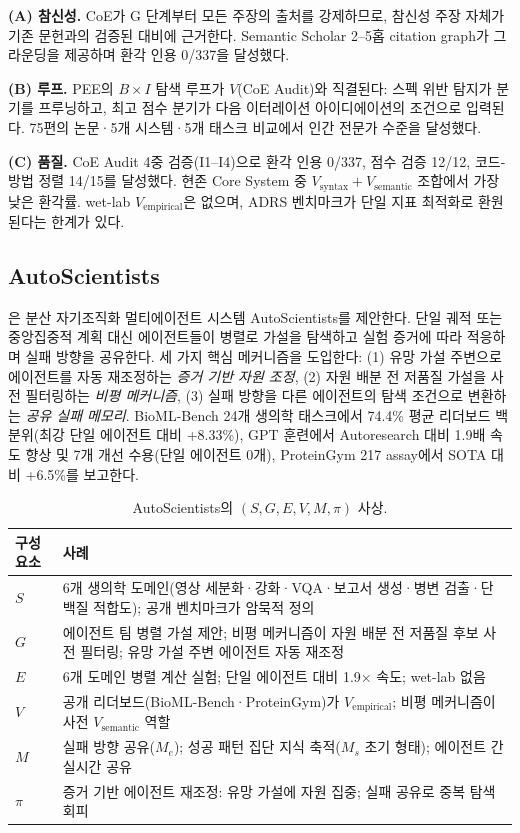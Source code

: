 \documentclass[11pt]{article}
\newcommand{\sgmvpi}{$(S, G, E, V, M, \pi)$}
\begin{document}
\noindent\textbf{(A) 참신성.} CoE가 G 단계부터 모든 주장의 출처를 강제하므로, 참신성 주장 자체가 기존 문헌과의 검증된 대비에 근거한다. Semantic Scholar 2--5홉 citation graph가 그라운딩을 제공하며 환각 인용 0/337을 달성했다.

\noindent\textbf{(B) 루프.} PEE의 $B \times I$ 탐색 루프가 $V$(CoE Audit)와 직결된다: 스펙 위반 탐지가 분기를 프루닝하고, 최고 점수 분기가 다음 이터레이션 아이디에이션의 조건으로 입력된다. 75편의 논문·5개 시스템·5개 태스크 비교에서 인간 전문가 수준을 달성했다.

\noindent\textbf{(C) 품질.} CoE Audit 4중 검증(I1--I4)으로 환각 인용 0/337, 점수 검증 12/12, 코드-방법 정렬 14/15를 달성했다. 현존 Core System 중 $V_\text{syntax}+V_\text{semantic}$ 조합에서 가장 낮은 환각률. wet-lab $V_\text{empirical}$은 없으며, ADRS 벤치마크가 단일 지표 최적화로 환원된다는 한계가 있다.

\subsection{AutoScientists}
\label{sec:autoscientists}

\citet{gao2026autoscientists}은 분산 자기조직화 멀티에이전트 시스템 AutoScientists를 제안한다. 단일 궤적 또는 중앙집중적 계획 대신 에이전트들이 병렬로 가설을 탐색하고 실험 증거에 따라 적응하며 실패 방향을 공유한다. 세 가지 핵심 메커니즘을 도입한다: (1) 유망 가설 주변으로 에이전트를 자동 재조정하는 \textit{증거 기반 자원 조정}, (2) 자원 배분 전 저품질 가설을 사전 필터링하는 \textit{비평 메커니즘}, (3) 실패 방향을 다른 에이전트의 탐색 조건으로 변환하는 \textit{공유 실패 메모리}. BioML-Bench 24개 생의학 태스크에서 74.4\% 평균 리더보드 백분위(최강 단일 에이전트 대비 +8.33\%), GPT 훈련에서 Autoresearch 대비 1.9배 속도 향상 및 7개 개선 수용(단일 에이전트 0개), ProteinGym 217 assay에서 SOTA 대비 +6.5\%를 보고한다.

\begin{table}[h]
\centering
\small
\begin{tabular}{@{}lp{9cm}@{}}
\toprule
구성요소 & 사례 \\
\midrule
$S$ & 6개 생의학 도메인(영상 세분화·강화·VQA·보고서 생성·병변 검출·단백질 적합도); 공개 벤치마크가 암묵적 정의 \\
$G$ & 에이전트 팀 병렬 가설 제안; 비평 메커니즘이 자원 배분 전 저품질 후보 사전 필터링; 유망 가설 주변 에이전트 자동 재조정 \\
$E$ & 6개 도메인 병렬 계산 실험; 단일 에이전트 대비 1.9$\times$ 속도; wet-lab 없음 \\
$V$ & 공개 리더보드(BioML-Bench·ProteinGym)가 $V_\text{empirical}$; 비평 메커니즘이 사전 $V_\text{semantic}$ 역할 \\
$M$ & 실패 방향 공유($M_e$); 성공 패턴 집단 지식 축적($M_s$ 초기 형태); 에이전트 간 실시간 공유 \\
$\pi$ & 증거 기반 에이전트 재조정: 유망 가설에 자원 집중; 실패 공유로 중복 탐색 회피 \\
\bottomrule
\end{tabular}
\caption{AutoScientists의 \sgmvpi{} 사상.}
\end{table}
\end{document}
